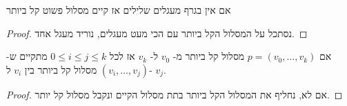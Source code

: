 \begin{claim}
אם אין בגרף מעגלים שלילים אז קיים מסלול פשוט קל ביותר
\end{claim}
\begin{proof}
נסתכל על המסלול הקל ביותר עם הכי מעט מעגלים, נוריד מעגל אחד.
\end{proof}



\begin{claim}
אם
$p = (v_0, \ldots, v_k)$
מסלול קל ביותר מ-%
$v_0$
ל-%
$v_k$
אז לכל
$0 \leq i \leq j \leq k$
מתקיים ש-%
$(v_i, \ldots, v_j)$
מסלול קל ביותר בין 
$v_i$
ל-%
$v_j$.
\end{claim}
\begin{proof}
אם לא, נחליף את המסלול הקל ביותר בתת מסלול הקיים ונקבל מסלול קל יותר.
\end{proof}
